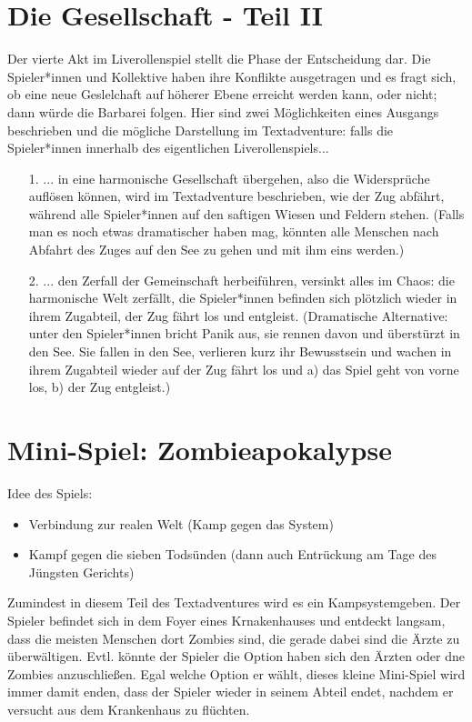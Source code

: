 \documentclass[12pt, a4paper, openany]{report}
\begin{document}
\section{Die Gesellschaft - Teil II} \label{die-gesellschaft2}
Der vierte Akt im Liverollenspiel stellt die Phase der Entscheidung dar. 
Die Spieler*innen und Kollektive haben ihre Konflikte ausgetragen und es fragt sich, ob eine neue Geslelchaft auf höherer Ebene erreicht werden kann, oder nicht; dann würde die Barbarei folgen.
Hier sind zwei Möglichkeiten eines Ausgangs beschrieben und die mögliche Darstellung im Textadventure: falls die Spieler*innen innerhalb des eigentlichen Liverollenspiels...
\begin{itemize}
\item[1.] ... in eine harmonische Gesellschaft übergehen, also die Widersprüche auflösen können, wird im Textadventure beschrieben, wie der Zug abfährt, während alle Spieler*innen auf den saftigen Wiesen und Feldern stehen. 
(Falls man es noch etwas dramatischer haben mag, könnten alle Menschen nach Abfahrt des Zuges auf den See zu gehen und mit ihm eins werden.)
\item[2.] ... den Zerfall der Gemeinschaft herbeiführen, versinkt alles im Chaos: die harmonische Welt zerfällt, die Spieler*innen befinden sich plötzlich wieder in ihrem Zugabteil, der Zug fährt los und entgleist. 
(Dramatische Alternative: unter den Spieler*innen bricht Panik aus, sie rennen davon und überstürzt in den See.
Sie fallen in den See, verlieren kurz ihr Bewusstsein und wachen in ihrem Zugabteil wieder auf der Zug fährt los und a) das Spiel geht von vorne los, b) der Zug entgleist.)
\end{itemize}

\section{Mini-Spiel: Zombieapokalypse} \label{zombieapokalypse}
Idee des Spiels:
\begin{itemize}
\item Verbindung zur realen Welt (Kamp gegen das System)
\item Kampf gegen die sieben Todsünden (dann auch Entrückung am Tage des Jüngsten Gerichts)
\end{itemize}
Zumindest in diesem Teil des Textadventures wird es ein Kampsystemgeben. 
Der Spieler befindet sich in dem Foyer eines Krnakenhauses und entdeckt langsam, dass die meisten Menschen dort Zombies sind, die gerade dabei sind die Ärzte zu überwältigen. 
Evtl. könnte der Spieler die Option haben sich den Ärzten oder dne Zombies anzuschließen.
Egal welche Option er wählt, dieses kleine Mini-Spiel wird immer damit enden, dass der Spieler wieder in seinem Abteil endet, nachdem er versucht aus dem Krankenhaus zu flüchten.
\end{document}
